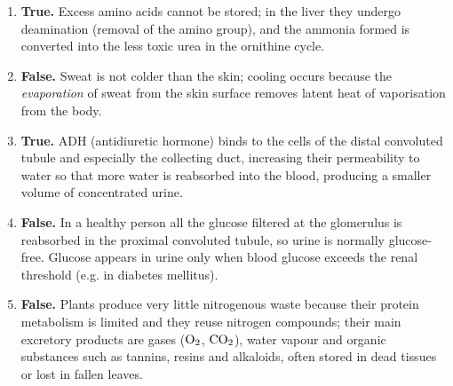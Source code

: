\documentclass[11pt]{article}
\newcommand{\cle}[1]{{\popxbold\color{popdark}#1}}
\begin{document}
\begin{corrige}
\begin{enumerate}
\item \textbf{True.} Excess amino acids cannot be stored; in the liver they undergo \cle{deamination} (removal of the amino group), and the ammonia formed is converted into the less toxic urea in the ornithine cycle.
\item \textbf{False.} Sweat is not colder than the skin; cooling occurs because the \emph{evaporation} of sweat from the skin surface removes latent heat of vaporisation from the body.
\item \textbf{True.} ADH (antidiuretic hormone) binds to the cells of the distal convoluted tubule and especially the collecting duct, increasing their permeability to water so that more water is reabsorbed into the blood, producing a smaller volume of concentrated urine.
\item \textbf{False.} In a healthy person all the glucose filtered at the glomerulus is reabsorbed in the proximal convoluted tubule, so urine is normally glucose-free. Glucose appears in urine only when blood glucose exceeds the renal threshold (e.g. in diabetes mellitus).
\item \textbf{False.} Plants produce very little nitrogenous waste because their protein metabolism is limited and they reuse nitrogen compounds; their main excretory products are gases ($\ce{O2}$, $\ce{CO2}$), water vapour and organic substances such as tannins, resins and alkaloids, often stored in dead tissues or lost in fallen leaves.
\end{enumerate}
\end{corrige}
\end{document}
